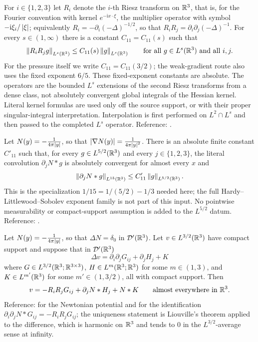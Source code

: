 \documentclass[11pt,reqno]{amsart}
\begin{document}
\begin{externalinput}\label{ext:CZ}
For $i\in\{1,2,3\}$ let $R_{i}$ denote the $i$-th Riesz transform on $\mathbb{R}^{3}$,
that is, for the Fourier convention with kernel $e^{-\mathrm{i}x\cdot\xi}$,
the multiplier operator with symbol $-\mathrm{i}\xi_{i}/\left\lvert \xi \right\rvert$;
equivalently $R_{i}=-\partial_{i}(-\Delta)^{-1/2}$, so that
$R_{i}R_{j}=\partial_{i}\partial_{j}(-\Delta)^{-1}$. For every $s\in(1,\infty)$
there is a constant $C_{11}=C_{11}(s)$ such that
\[
  \left\lVert R_{i}R_{j}g \right\rVert_{L^{s}(\mathbb{R}^{3})}\le C_{11}(s)\left\lVert g \right\rVert_{L^{s}(\mathbb{R}^{3})}
  \qquad\text{for all }g\in L^{s}(\mathbb{R}^{3})\text{ and all }i,j .
\]
For the pressure itself we write $C_{11}=C_{11}(3/2)$; the weak-gradient
route also uses the fixed exponent $6/5$. These fixed-exponent constants
are absolute. The operators are the bounded $L^s$ extensions of the
second Riesz transforms from a dense class, not absolutely convergent
global integrals of the Hessian kernel. Literal kernel formulas are used
only off the source support, or with their proper singular-integral
interpretation. Interpolation is first performed on $L^2\cap L^s$ and
then passed to the completed $L^s$ operator.
Reference: \cite[Ch.~II--III]{Stein1970}.
\end{externalinput}

\begin{externalinput}
\label{ext:riesz}
Let $N(y)=-\tfrac1{4\pi\left\lvert y \right\rvert}$, so that $\left\lvert \nabla N(y) \right\rvert=\tfrac1{4\pi\left\lvert y \right\rvert^{2}}$.
There is an absolute finite constant $C'_{11}$ such that, for every
$g\in L^{5/2}(\mathbb{R}^3)$ and every $j\in\{1,2,3\}$, the literal convolution
$\partial_jN*g$ is absolutely convergent for almost every $x$ and
\[
  \left\lVert \partial_jN*g \right\rVert_{L^{15}(\mathbb{R}^3)}
      \le C'_{11}\left\lVert g \right\rVert_{L^{5/2}(\mathbb{R}^3)} .
\]
This is the specialization $1/15=1/(5/2)-1/3$ needed here; the full
Hardy--Littlewood--Sobolev exponent family is not part of this input.
No pointwise measurability or compact-support assumption is added to the
$L^{5/2}$ datum.
Reference: \cite[Ch.~V, Thm.~1]{Stein1970}.
\end{externalinput}

\begin{externalinput}
\label{ext:newtonian}
Let $N(y)=-\tfrac1{4\pi\left\lvert y \right\rvert}$, so that $\Delta N=\delta_{0}$ in
$\mathcal{D}'(\mathbb{R}^{3})$. Let $v\in L^{3/2}(\mathbb{R}^{3})$ have compact support and
suppose that in $\mathcal{D}'(\mathbb{R}^{3})$
\[
  \Delta v=\partial_{i}\partial_{j}G_{ij}+\partial_{j}H_{j}+K
\]
where $G\in L^{3/2}(\mathbb{R}^{3};\mathbb{R}^{3\times3})$, $H\in L^{m}(\mathbb{R}^{3};\mathbb{R}^{3})$ for some
$m\in(1,3)$, and $K\in L^{m'}(\mathbb{R}^{3})$ for some $m'\in(1,3/2)$, all with compact
support. Then
\[
  v=-R_{i}R_{j}G_{ij}+\partial_{j}N*H_{j}+N*K
  \qquad\text{almost everywhere in }\mathbb{R}^{3}.
\]
Reference: \cite[Ch.~2 and Ch.~4]{GilbargTrudinger2001} for the Newtonian
potential and \cite[Ch.~III, V]{Stein1970} for the identification
$\partial_{i}\partial_{j}N*G_{ij}=-R_{i}R_{j}G_{ij}$; the uniqueness statement
is Liouville's theorem applied to the difference, which is harmonic on $\mathbb{R}^{3}$
and tends to $0$ in the $L^{3/2}$-average sense at infinity.
\end{externalinput}
\end{document}
